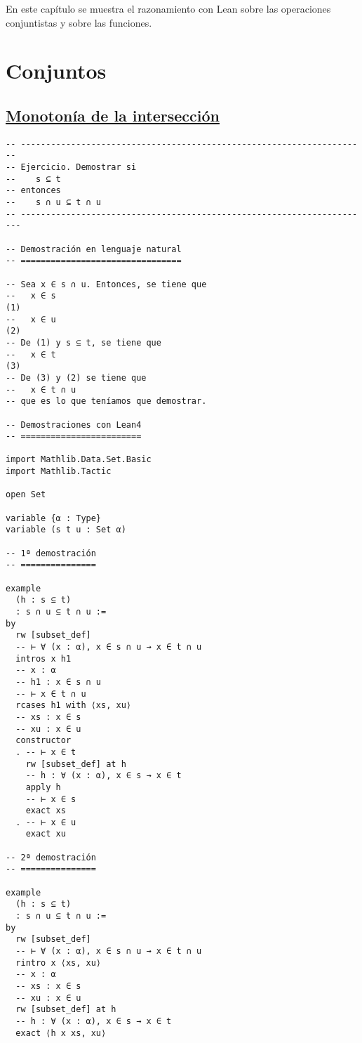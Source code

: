En este capítulo se muestra el razonamiento con Lean sobre las operaciones
conjuntistas y sobre las funciones.

\section{Conjuntos}
\label{sec:org43f789f}

\subsection{\href{./src/Conjuntos/Monotonia\_de\_la\_interseccion.lean}{Monotonía de la intersección}}
\label{sec:org3fc22a4}
\begin{verbatim}
-- ---------------------------------------------------------------------
-- Ejercicio. Demostrar si
--    s ⊆ t
-- entonces
--    s ∩ u ⊆ t ∩ u
-- ----------------------------------------------------------------------

-- Demostración en lenguaje natural
-- ================================

-- Sea x ∈ s ∩ u. Entonces, se tiene que
--   x ∈ s                                                           (1)
--   x ∈ u                                                           (2)
-- De (1) y s ⊆ t, se tiene que
--   x ∈ t                                                           (3)
-- De (3) y (2) se tiene que
--   x ∈ t ∩ u
-- que es lo que teníamos que demostrar.

-- Demostraciones con Lean4
-- ========================

import Mathlib.Data.Set.Basic
import Mathlib.Tactic

open Set

variable {α : Type}
variable (s t u : Set α)

-- 1ª demostración
-- ===============

example
  (h : s ⊆ t)
  : s ∩ u ⊆ t ∩ u :=
by
  rw [subset_def]
  -- ⊢ ∀ (x : α), x ∈ s ∩ u → x ∈ t ∩ u
  intros x h1
  -- x : α
  -- h1 : x ∈ s ∩ u
  -- ⊢ x ∈ t ∩ u
  rcases h1 with ⟨xs, xu⟩
  -- xs : x ∈ s
  -- xu : x ∈ u
  constructor
  . -- ⊢ x ∈ t
    rw [subset_def] at h
    -- h : ∀ (x : α), x ∈ s → x ∈ t
    apply h
    -- ⊢ x ∈ s
    exact xs
  . -- ⊢ x ∈ u
    exact xu

-- 2ª demostración
-- ===============

example
  (h : s ⊆ t)
  : s ∩ u ⊆ t ∩ u :=
by
  rw [subset_def]
  -- ⊢ ∀ (x : α), x ∈ s ∩ u → x ∈ t ∩ u
  rintro x ⟨xs, xu⟩
  -- x : α
  -- xs : x ∈ s
  -- xu : x ∈ u
  rw [subset_def] at h
  -- h : ∀ (x : α), x ∈ s → x ∈ t
  exact ⟨h x xs, xu⟩


\end{verbatim}
